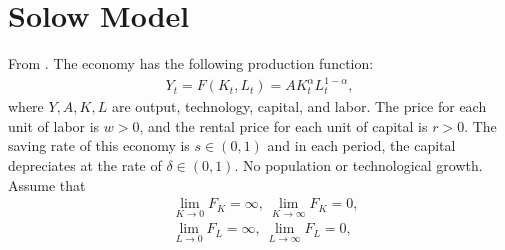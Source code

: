 \documentclass[10pt,a4paper]{book}
\theoremstyle{definition}\newtheorem{definition}{Definition}
\theoremstyle{definition}\newtheorem{fact}{Fact}
\theoremstyle{definition}\newtheorem{ex}{Ex.}
\theoremstyle{definition}\newtheorem{project}{Project}
\theoremstyle{definition}\newtheorem{problem}{Problem}
\theoremstyle{definition}\newtheorem{example}{Example}
\numberwithin{theorem}{chapter}
\numberwithin{corollary}{chapter}
\numberwithin{assumption}{chapter}
\numberwithin{definition}{chapter}
\numberwithin{prop}{chapter}
\numberwithin{notation}{chapter}
\numberwithin{problem}{chapter}
\numberwithin{example}{chapter}
\numberwithin{fact}{chapter}
\numberwithin{ex}{chapter}
\begin{document}
	\section{Solow Model}
	From \citet{romer2019advanced}. The economy has the following production function:
	\begin{align*}
		Y_t = F(K_t,L_t) = A K_t^\alpha L_t^{1-\alpha}, 
	\end{align*}
	where $Y, A, K, L$ are output, technology, capital, and labor. The price for each unit of labor is $w > 0$, and the rental price for each unit of capital is $r > 0$. The saving rate of this economy is $s \in (0,1)$ and in each period, the capital depreciates at the rate of $\delta \in (0,1)$. No population or technological growth. Assume that
	\begin{align*}
		& \lim_{K\to 0} F_K = \infty, \ \lim_{K\to \infty} F_K = 0, \\
		& \lim_{L\to 0} F_L = \infty, \ \lim_{L\to \infty} F_L = 0, \\
	\end{align*}
	
\end{document}
